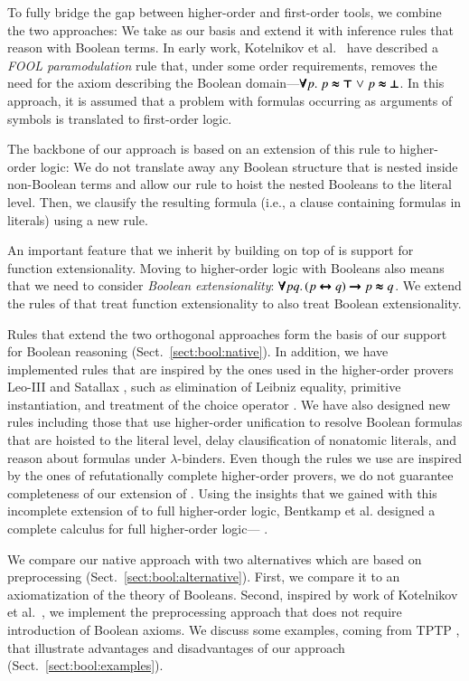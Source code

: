  To fully bridge the gap between higher-order and first-order tools,
we combine the two approaches: We take \lsup{} as our basis and  extend it with inference rules that reason with
Boolean terms. In early work, Kotelnikov et al.\ 
\cite{kotelnikov-15-fool} have described a \emph{FOOL paramodulation}
rule that, under some order requirements, removes the need for the axiom
describing the Boolean domain---$\pmb{\forall} p. \; p \pmb{\approx} \pmb{\top} \mathrel\lor p
\pmb{\approx} \pmb{\bot}$. In this approach, it is assumed that a problem with formulas occurring as
arguments of symbols is translated to first-order logic. 

The backbone of our approach is based on an extension of this rule to higher-order
logic: We do not translate away any Boolean structure that is nested inside
non-Boolean terms and allow our rule to hoist the nested Booleans to the
literal level. Then, we clausify the resulting formula (i.e., a clause containing formulas in literals) using a new rule.


 An important feature that we inherit by building on top of \lsup{}
is support for function extensionality. Moving to higher-order logic with
Booleans also means that we need to consider \emph{Boolean extensionality}:
$\pmb{\forall} pq. \, (p \pmb{\leftrightarrow} q) \pmb{\rightarrow} p \pmb{\approx} q$. We extend the rules of
\lsup{} that treat function extensionality to also treat Boolean
extensionality.

Rules that extend the two orthogonal approaches form the basis of our support
for Boolean reasoning (Sect.~\ref{sect:bool:native}). In addition, we have
implemented rules that are inspired by the ones used in the higher-order provers
Leo-III \cite{sb-21-leo3} and Satallax \cite{cb-12-satallax}, such as
elimination of Leibniz equality, primitive instantiation, and treatment of the choice
operator \cite{pa-01-classical-ty-thy}. We have also designed new rules including those that use
higher-order unification to resolve Boolean formulas that are hoisted to the literal
level, delay clausification of nonatomic literals, and reason about formulas under
$\lambda$-binders. Even though the rules we use are inspired by
the ones of refutationally complete higher-order provers, we do not guarantee
completeness of our extension of \lsup{}. Using the insights that we gained with
this incomplete extension of \lsup{} to full higher-order logic, Bentkamp et al.
designed a complete calculus for full higher-order logic---\osup{}
\cite{bbtv-21-full-ho-sup}.


We compare our native approach with two alternatives which are based on
preprocessing (Sect.~\ref{sect:bool:alternative}). First, we compare it to  an
axiomatization of the theory of Booleans. Second, inspired by work of
Kotelnikov et al.\ \cite{kotelnikov-16-fool}, we implement the preprocessing approach that does not
require introduction of Boolean axioms.
We discuss some examples, coming from TPTP \cite{gs-17-tptp}, that
illustrate advantages and disadvantages of our approach (Sect.~\ref{sect:bool:examples}).

